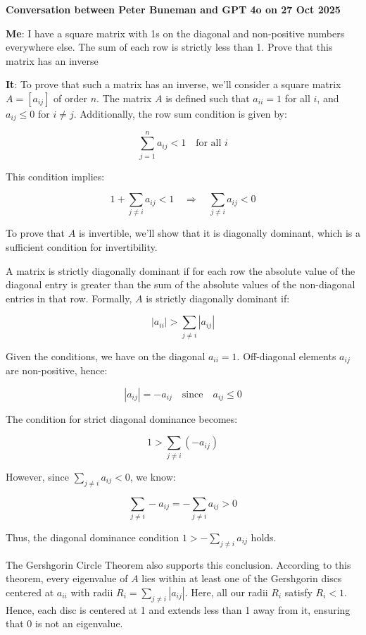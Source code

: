 \documentclass{article}
\begin{document}
 
\centerline{\bf Conversation between Peter Buneman and  GPT 4o on 27 Oct 2025}




{\bf Me}: I have a square matrix with 1s on the diagonal and non-positive
numbers everywhere else. The sum of each row is strictly less than
1. Prove that this matrix has an inverse

{\bf It}: To prove that such a matrix has an inverse, we'll consider a square matrix \( A = [a_{ij}] \) of order \( n \). The matrix \( A \) is defined such that \( a_{ii} = 1 \) for all \( i \), and \( a_{ij} \leq 0 \) for \( i \neq j \). Additionally, the row sum condition is given by:

\[
\sum_{j=1}^{n} a_{ij} < 1 \quad \text{for all } i
\]

This condition implies:

\[
1 + \sum_{j \neq i} a_{ij} < 1 \quad \Rightarrow \quad \sum_{j \neq i} a_{ij} < 0
\]

To prove that \( A \) is invertible, we'll show that it is diagonally dominant, which is a sufficient condition for invertibility.

A matrix is strictly diagonally dominant if for each row the absolute value of the diagonal entry is greater than the sum of the absolute values of the non-diagonal entries in that row. Formally, \( A \) is strictly diagonally dominant if:

\[
|a_{ii}| > \sum_{j \neq i} |a_{ij}|
\]

Given the conditions, we have on the diagonal \( a_{ii} = 1 \). Off-diagonal elements \( a_{ij} \) are non-positive, hence:

\[
|a_{ij}| = -a_{ij} \quad \text{since} \quad a_{ij} \leq 0
\]

The condition for strict diagonal dominance becomes:

\[
1 > \sum_{j \neq i} (-a_{ij})
\]

However, since \( \sum_{j \neq i} a_{ij} < 0 \), we know:

\[
\sum_{j \neq i} -a_{ij} = -\sum_{j \neq i} a_{ij} > 0
\]

Thus, the diagonal dominance condition \( 1 > -\sum_{j \neq i} a_{ij} \) holds.

The Gershgorin Circle Theorem also supports this conclusion. According to this theorem, every eigenvalue of \( A \) lies within at least one of the Gershgorin discs centered at \( a_{ii} \) with radii \( R_i = \sum_{j \neq i} |a_{ij}| \). Here, all our radii \( R_i \) satisfy \( R_i < 1 \). Hence, each disc is centered at 1 and extends less than 1 away from it, ensuring that 0 is not an eigenvalue.
\end{document}
